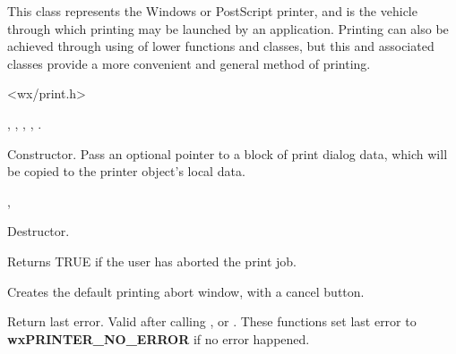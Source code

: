 This class represents the Windows or PostScript printer, and is the vehicle through
which printing may be launched by an application. Printing can also
be achieved through using of lower functions and classes, but
this and associated classes provide a more convenient and general
method of printing.




<wx/print.h>


, , ,\rtfsp
{}, .




Constructor. Pass an optional pointer to a block of print
dialog data, which will be copied to the printer object's local data.


,



Destructor.

\label{wxprinterabort}


Returns TRUE if the user has aborted the print job.

\label{wxprintercreateabortwindow}


Creates the default printing abort window, with a cancel button.


\label{wxprintergetlasterror}


Return last error. Valid after calling ,
 or 
. These functions 
set last error to {\bf wxPRINTER\_NO\_ERROR} if no error happened.

